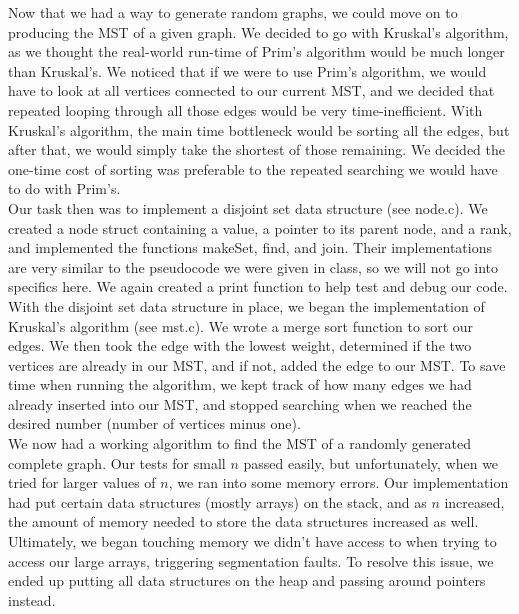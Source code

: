 \documentclass[12pt]{article}
\begin{document}
Now that we had a way to generate random graphs, we could move on to producing the MST of a given graph. We decided to go with Kruskal's algorithm, as we thought the real-world run-time of Prim's algorithm would be much longer than Kruskal's. We noticed that if we were to use Prim's algorithm, we would have to look at all vertices connected to our current MST, and we decided that repeated looping through all those edges would be very time-inefficient. With Kruskal's algorithm, the main time bottleneck would be sorting all the edges, but after that, we would simply take the shortest of those remaining. We decided the one-time cost of sorting was preferable to the repeated searching we would have to do with Prim's. \\

Our task then was to implement a disjoint set data structure (see node.c). We created a node struct containing a value, a pointer to its parent node, and a rank, and implemented the functions makeSet, find, and join. Their implementations are very similar to the pseudocode we were given in class, so we will not go into specifics here. We again created a print function to help test and debug our code. \\

With the disjoint set data structure in place, we began the implementation of Kruskal's algorithm (see mst.c). We wrote a merge sort function to sort our edges. We then took the edge with the lowest weight, determined if the two vertices are already in our MST, and if not, added the edge to our MST. To save time when running the algorithm, we kept track of how many edges we had already inserted into our MST, and stopped searching when we reached the desired number (number of vertices minus one). \\

We now had a working algorithm to find the MST of a randomly generated complete graph. Our tests for small $n$ passed easily, but unfortunately, when we tried for larger values of $n$, we ran into some memory errors. Our implementation had put certain data structures (mostly arrays) on the stack, and as $n$ increased, the amount of memory needed to store the data structures increased as well. Ultimately, we began touching memory we didn't have access to when trying to access our large arrays, triggering segmentation faults. To resolve this issue, we ended up putting all data structures on the heap and passing around pointers instead. \\
\end{document}
